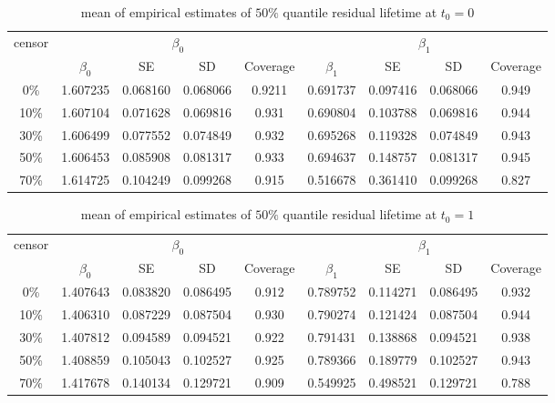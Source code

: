 \documentclass[12pt]{article}
\begin{document}
	\begin{table}[hbt!]
		\caption{mean of empirical estimates of $50\%$ quantile residual lifetime at $t_0=0$}
		\centering
		\begin{tabular}{|c|c|c|c|c|c|c|c|c|}
			\hline
			\multirow{2}{*}{censor} & \multicolumn{4}{c|}{$\beta_0$} & \multicolumn{4}{c|}{$\beta_1$}\\ \cline{2-9}
			& $\beta_0$ & SE & SD  & Coverage  & $\beta_1$ & SE & SD & Coverage\\
			\hline\hline
			0\% & 1.607235 & 0.068160 & 0.068066 & 0.9211 & 0.691737 & 0.097416 & 0.068066 & 0.949 \\
			10\% & 1.607104 & 0.071628 & 0.069816 & 0.931 & 0.690804 & 0.103788 & 0.069816 & 0.944 \\
			30\% & 1.606499 & 0.077552 & 0.074849 & 0.932 & 0.695268 & 0.119328 & 0.074849 & 0.943 \\
			50\% & 1.606453 & 0.085908 & 0.081317 & 0.933 & 0.694637 & 0.148757 & 0.081317 & 0.945 \\
			70\% & 1.614725 & 0.104249 & 0.099268 & 0.915 & 0.516678 & 0.361410 & 0.099268 & 0.827 \\  
			\hline
		\end{tabular}
	\end{table}
	\begin{table}[hbt!]
		\caption{mean of empirical estimates of $50\%$ quantile residual lifetime at $t_0=1$}
		\centering
		\begin{tabular}{|c|c|c|c|c|c|c|c|c|}
			\hline
			\multirow{2}{*}{censor} & \multicolumn{4}{c|}{$\beta_0$} & \multicolumn{4}{c|}{$\beta_1$}\\ \cline{2-9}
			& $\beta_0$ & SE & SD  & Coverage  & $\beta_1$ & SE & SD & Coverage\\
			\hline\hline
			0\% & 1.407643 & 0.083820 & 0.086495 & 0.912 & 0.789752 & 0.114271 & 0.086495 & 0.932 \\
			10\% & 1.406310 & 0.087229 & 0.087504 & 0.930 & 0.790274 & 0.121424 & 0.087504 & 0.944 \\
			30\% & 1.407812 & 0.094589 & 0.094521 & 0.922 & 0.791431 & 0.138868 & 0.094521 & 0.938 \\
			50\% & 1.408859 & 0.105043 & 0.102527 & 0.925 & 0.789366 & 0.189779 & 0.102527 & 0.943 \\
			70\% & 1.417678 & 0.140134 & 0.129721 & 0.909 & 0.549925 & 0.498521 & 0.129721 & 0.788 \\ 
			\hline
		\end{tabular}
	\end{table}
\end{document}
